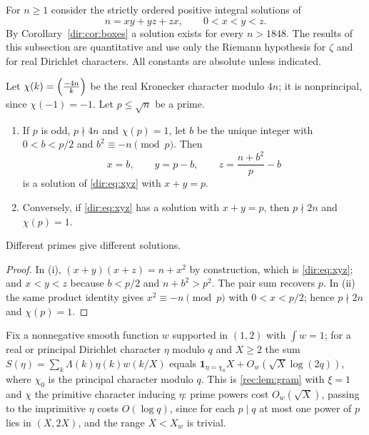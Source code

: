 For $n\ge1$ consider the strictly ordered positive integral solutions of
\begin{equation}\label{dir:eq:xyz}
 n=xy+yz+zx,\qquad 0<x<y<z .
\end{equation}
By Corollary~\ref{dir:cor:boxes} a solution exists for every $n>1848$. The results of this
subsection are quantitative and use only the Riemann hypothesis for $\zeta$ and for
real Dirichlet characters. All constants are absolute unless indicated.

\begin{lemma}\label{dir:lem:split}
Let $\chi(k)=\Bigl(\frac{-4n}{k}\Bigr)$ be the real Kronecker character modulo $4n$; it is
nonprincipal, since $\chi(-1)=-1$. Let $p\le\sqrt n$ be a prime.
\begin{enumerate}[label=\textup{(\roman*)}]
\item If $p$ is odd, $p\nmid 4n$ and $\chi(p)=1$, let $b$ be the unique integer with
 $0<b<p/2$ and $b^2\equiv-n\pmod p$. Then
 \[
  x=b,\qquad y=p-b,\qquad z=\frac{n+b^2}{p}-b
 \]
 is a solution of \eqref{dir:eq:xyz} with $x+y=p$.
\item Conversely, if \eqref{dir:eq:xyz} has a solution with $x+y=p$, then
 $p\nmid2n$ and $\chi(p)=1$.
\end{enumerate}
Different primes give different solutions.
\end{lemma}

\begin{proof}
In (i), $(x+y)(x+z)=n+x^2$ by construction, which is \eqref{dir:eq:xyz}; and
$x<y<z$ because $b<p/2$ and $n+b^2>p^2$. The pair sum recovers $p$. In (ii) the same
product identity gives $x^2\equiv-n\pmod p$ with $0<x<p/2$; hence $p\nmid 2n$ and
$\chi(p)=1$.
\end{proof}

\begin{remark}\label{dir:lem:smooth}
Fix a nonnegative smooth function $w$ supported in $(1,2)$ with $\int w=1$; for a real or
principal Dirichlet character $\eta$ modulo $q$ and $X\ge2$ the sum
$S(\eta)=\sum_k\Lambda(k)\eta(k)w(k/X)$ equals $\mathbf 1_{\eta=\chi_0}X+O_w(\sqrt
X\log(2q))$, where $\chi_0$ is the principal character modulo $q$. This is
\cref{rec:lem:gram} with $\xi=1$ and $\chi$ the primitive character inducing $\eta$: prime
powers cost $O_w(\sqrt X)$, passing to the imprimitive $\eta$ costs $O(\log q)$, since for
each $p\mid q$ at most one power of $p$ lies in $(X,2X)$, and the range $X<X_w$ is trivial.
\end{remark}

